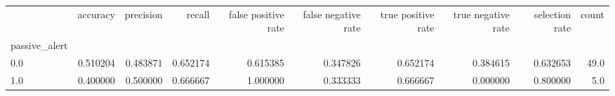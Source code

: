 \begin{tabular}{lrrrrrrrrr}
\toprule
{} &  accuracy &  precision &    recall &  false positive rate &  false negative rate &  true positive rate &  true negative rate &  selection rate &  count \\
passive\_alert &           &            &           &                      &                      &                     &                     &                 &        \\
\midrule
0.0           &  0.510204 &   0.483871 &  0.652174 &             0.615385 &             0.347826 &            0.652174 &            0.384615 &        0.632653 &   49.0 \\
1.0           &  0.400000 &   0.500000 &  0.666667 &             1.000000 &             0.333333 &            0.666667 &            0.000000 &        0.800000 &    5.0 \\
\bottomrule
\end{tabular}
